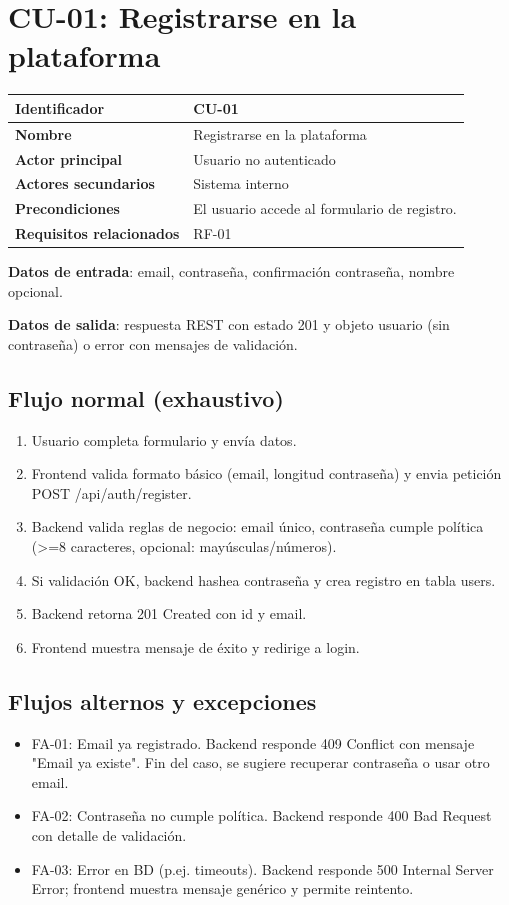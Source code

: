 \documentclass[12pt,a4paper]{article}
\begin{document}
\newpage
\section{CU-01: Registrarse en la plataforma}
\begin{tabular}{|p{3.5cm}|p{10cm}|}
\hline
\textbf{Identificador} & CU-01 \\
\hline
\textbf{Nombre} & Registrarse en la plataforma \\
\hline
\textbf{Actor principal} & Usuario no autenticado \\
\hline
\textbf{Actores secundarios} & Sistema interno \\
\hline
\textbf{Precondiciones} & El usuario accede al formulario de registro. \\
\hline
\textbf{Requisitos relacionados} & RF-01 \\
\hline
\end{tabular}

\vspace{0.5em}
\textbf{Datos de entrada}: email, contrase\~na, confirmaci\'on contrase\~na, nombre opcional.

\textbf{Datos de salida}: respuesta REST con estado 201 y objeto usuario (sin contrase\~na) o error con mensajes de validaci\'on.

\subsection*{Flujo normal (exhaustivo)}
\begin{enumerate}[leftmargin=*]
    \item Usuario completa formulario y env\'ia datos.
    \item Frontend valida formato b\'asico (email, longitud contrase\~na) y envia petici\'on POST /api/auth/register.
    \item Backend valida reglas de negocio: email \'unico, contrase\~na cumple pol\'itica (>=8 caracteres, opcional: may\'usculas/n\'umeros).
    \item Si validaci\'on OK, backend hashea contrase\~na y crea registro en tabla users.
    \item Backend retorna 201 Created con id y email.
    \item Frontend muestra mensaje de \'exito y redirige a login.
\end{enumerate}

\subsection*{Flujos alternos y excepciones}
\begin{itemize}[leftmargin=*]
    \item FA-01: Email ya registrado. Backend responde 409 Conflict con mensaje "Email ya existe". Fin del caso, se sugiere recuperar contrase\~na o usar otro email.
    \item FA-02: Contrase\~na no cumple pol\'itica. Backend responde 400 Bad Request con detalle de validaci\'on.
    \item FA-03: Error en BD (p.ej. timeouts). Backend responde 500 Internal Server Error; frontend muestra mensaje gen\'erico y permite reintento.
\end{itemize}
\end{document}
